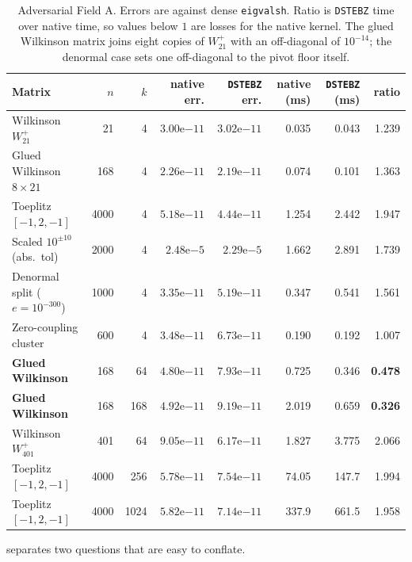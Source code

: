 \documentclass[twocolumn,10pt,a4paper]{article}
\theoremstyle{plain}
\theoremstyle{definition}
\begin{document}
\begin{table}[t]
\centering\small
\caption{Adversarial Field A. Errors are against dense \texttt{eigvalsh}.
Ratio is \texttt{DSTEBZ} time over native time, so values below $1$ are losses
for the native kernel. The glued Wilkinson matrix joins eight copies of
$W^{+}_{21}$ with an off-diagonal of $10^{-14}$; the denormal case sets one
off-diagonal to the pivot floor itself.}
\label{tab:adversarial}
\begin{tabular}{lrrrrrrr}
\toprule
Matrix & $n$ & $k$ & native err. & \texttt{DSTEBZ} err. & native (ms) & \texttt{DSTEBZ} (ms) & ratio \\
\midrule
Wilkinson $W^{+}_{21}$        & 21   & 4    & $3.00\text{e}{-11}$ & $3.02\text{e}{-11}$ & 0.035 & 0.043 & 1.239\\
Glued Wilkinson $8\times21$   & 168  & 4    & $2.26\text{e}{-11}$ & $2.19\text{e}{-11}$ & 0.074 & 0.101 & 1.363\\
Toeplitz $[-1,2,-1]$          & 4000 & 4    & $5.18\text{e}{-11}$ & $4.44\text{e}{-11}$ & 1.254 & 2.442 & 1.947\\
Scaled $10^{\pm10}$ (abs.\ tol) & 2000 & 4  & $2.48\text{e}{-5}$  & $2.29\text{e}{-5}$  & 1.662 & 2.891 & 1.739\\
Denormal split ($e=10^{-300}$) & 1000 & 4   & $3.35\text{e}{-11}$ & $5.19\text{e}{-11}$ & 0.347 & 0.541 & 1.561\\
Zero-coupling cluster         & 600  & 4    & $3.48\text{e}{-11}$ & $6.73\text{e}{-11}$ & 0.190 & 0.192 & 1.007\\
\midrule
\textbf{Glued Wilkinson}      & 168  & 64   & $4.80\text{e}{-11}$ & $7.93\text{e}{-11}$ & 0.725 & 0.346 & \textbf{0.478}\\
\textbf{Glued Wilkinson}      & 168  & 168  & $4.92\text{e}{-11}$ & $9.19\text{e}{-11}$ & 2.019 & 0.659 & \textbf{0.326}\\
Wilkinson $W^{+}_{401}$       & 401  & 64   & $9.05\text{e}{-11}$ & $6.17\text{e}{-11}$ & 1.827 & 3.775 & 2.066\\
Toeplitz $[-1,2,-1]$          & 4000 & 256  & $5.78\text{e}{-11}$ & $7.54\text{e}{-11}$ & 74.05 & 147.7 & 1.994\\
Toeplitz $[-1,2,-1]$          & 4000 & 1024 & $5.82\text{e}{-11}$ & $7.14\text{e}{-11}$ & 337.9 & 661.5 & 1.958\\
\bottomrule
\end{tabular}
\end{table}

 separates two questions that are easy to conflate.
\end{document}
